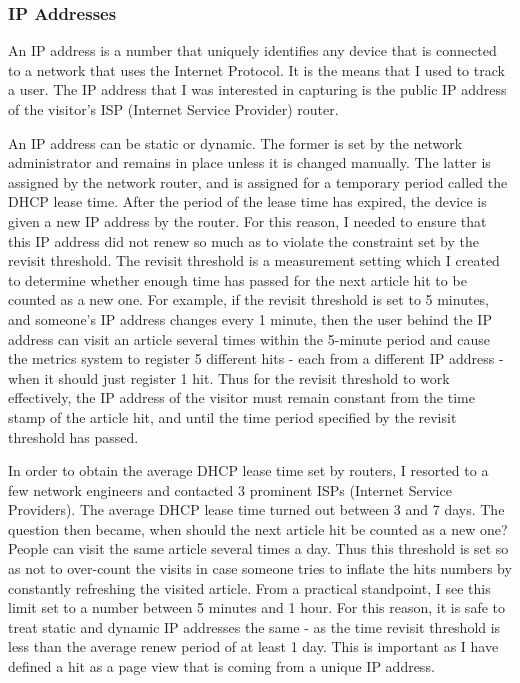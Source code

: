 \documentclass[12pt]{article}
\begin{document}
\subsubsection{IP Addresses}
An IP address is a number that uniquely identifies any device that is connected to a network that uses the Internet Protocol. It is the means that I used to track a user. The IP address that I was interested in capturing is the public IP address of the visitor's ISP (Internet Service Provider) router. 

An IP address can be static or dynamic. The former is set by the network administrator and remains in place unless it is changed manually. The latter is assigned by the network router, and is assigned for a temporary period called the DHCP lease time. After the period of the lease time has expired, the device is given a new IP address by the router. For this reason, I needed to ensure that this IP address did not renew so much as to violate the constraint set by the revisit threshold. The revisit threshold is a measurement setting which I created to determine whether enough time has passed for the next article hit to be counted as a new one. For example, if the revisit threshold is set to 5 minutes, and someone's IP address changes every 1 minute, then the user behind the IP address can visit an article several times within the 5-minute period and cause the metrics system to register 5 different hits - each from a different IP address - when it should just register 1 hit. Thus for the revisit threshold to work effectively, the IP address of the visitor must remain constant from the time stamp of the article hit, and until the time period specified by the revisit threshold has passed. 

In order to obtain the average DHCP lease time set by routers, I resorted to a few network engineers and contacted 3 prominent ISPs (Internet Service Providers). The average DHCP lease time turned out between 3 and 7 days. The question then became, when should the next article hit be counted as a new one? People can visit the same article several times a day. Thus this threshold is set so as not to over-count the visits in case someone tries to inflate the hits numbers by constantly refreshing the visited article. From a practical standpoint, I see this limit set to a number between 5 minutes and 1 hour. For this reason, it is safe to treat static and dynamic IP addresses the same - as the time revisit threshold is less than the average renew period of at least 1 day. This is important as I have defined a hit as a page view that is coming from a unique IP address.
\end{document}
